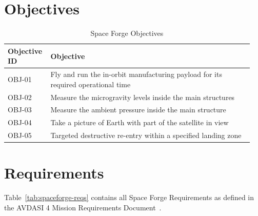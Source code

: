 \documentclass[a4paper, 11pt, conference]{IEEEtran}
\begin{document}
\section*{Objectives}
\label{sec:obj}

\begin{table}[H]
\centering
\caption{Space Forge Objectives}
\label{tab:spaceforge-objs}
\footnotesize
\renewcommand{\arraystretch}{1.2}
\begin{tabular}{@{}p{0.15\linewidth}p{0.80\linewidth}@{}}
\toprule
\textbf{Objective ID} & \textbf{Objective} \\
\midrule
OBJ-01 & Fly and run the in-orbit manufacturing payload for its required operational time \\
OBJ-02 & Measure the microgravity levels inside the main structures \\
OBJ-03 & Measure the ambient pressure inside the main structure \\
OBJ-04 & Take a picture of Earth with part of the satellite in view \\
OBJ-05 & Targeted destructive re-entry within a specified landing zone \\
\bottomrule
\end{tabular}
\end{table}
\normalsize



\section*{Requirements}
\label{sec:req}

Table~\ref{tab:spaceforge-reqs} contains all Space Forge Requirements as defined in the AVDASI 4 Mission Requirements Document~\cite{williams_avdasi_2025}.
\end{document}
